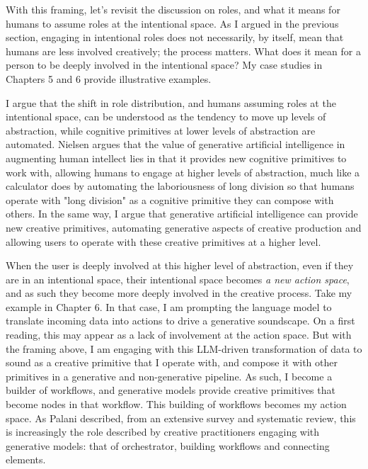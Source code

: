 With this framing, let's revisit the discussion on roles, and what it means for humans to assume roles at the intentional space. As I argued in the previous section, engaging in intentional roles does not necessarily, by itself, mean that humans are less involved creatively; the process matters. What does it mean for a person to be deeply involved in the intentional space? My case studies in Chapters 5 and 6 provide illustrative examples.

I argue that the shift in role distribution, and humans assuming roles at the intentional space, can be understood as the tendency to move up levels of abstraction, while cognitive primitives at lower levels of abstraction are automated. Nielsen argues that the value of generative artificial intelligence in augmenting human intellect lies in that it provides new cognitive primitives to work with, allowing humans to engage at higher levels of abstraction, much like a calculator does by automating the laboriousness of long division so that humans operate with "long division" as a cognitive primitive they can compose with others. In the same way, I argue that generative artificial intelligence can provide new creative primitives, automating generative aspects of creative production and allowing users to operate with these creative primitives at a higher level.

When the user is deeply involved at this higher level of abstraction, even if they are in an intentional space, their intentional space becomes \textit{a new action space}, and as such they become more deeply involved in the creative process. Take my example in Chapter 6. In that case, I am prompting the language model to translate incoming data into actions to drive a generative soundscape. On a first reading, this may appear as a lack of involvement at the action space. But with the framing above, I am engaging with this LLM-driven transformation of data to sound as a creative primitive that I operate with, and compose it with other primitives in a generative and non-generative pipeline. As such, I become a builder of workflows, and generative models provide creative primitives that become nodes in that workflow. This building of workflows becomes my action space. As Palani described, from an extensive survey and systematic review, this is increasingly the role described by creative practitioners engaging with generative models: that of orchestrator, building workflows and connecting elements.


